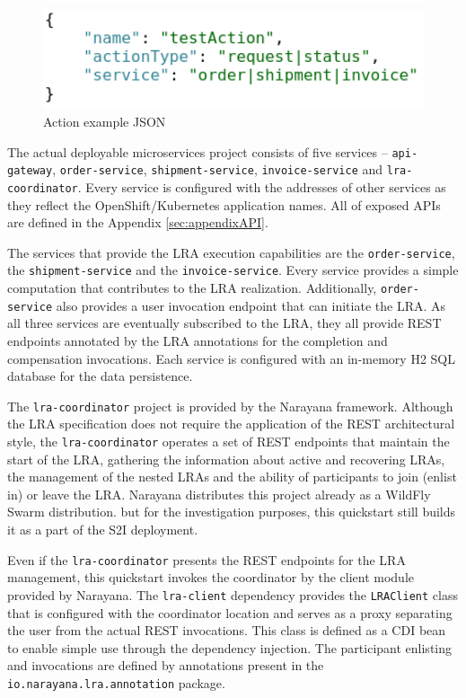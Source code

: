\documentclass[oneside,
  digital, %
  table,   %
  nolof,     %
  nolot,     %
]{fithesis3}
\begin{document}
\begin{figure}[h]
    \begin{center}
        \includegraphics[height=30mm]{images/actionJSON.png}
    \end{center}
    \caption{Action example JSON}
    \label{fig:action-json}
\end{figure}

The actual deployable microservices project consists of five services -- \texttt{api-gateway}, \texttt{order-service}, \texttt{shipment-service}, \texttt{invoice-service} and \texttt{lra-coordinator}. Every service is configured with the addresses of other services as they reflect the OpenShift/Kubernetes application names. All of exposed APIs are defined in the Appendix \ref{sec:appendixAPI}.

The services that provide the LRA execution capabilities are the \texttt{order-service}, the \texttt{shipment-service} and the \texttt{invoice-service}. Every service provides a simple computation that contributes to the LRA realization. Additionally, \texttt{order-service} also provides a user invocation endpoint that can initiate the LRA. As all three services are eventually subscribed to the LRA, they all provide REST endpoints annotated by the LRA annotations for the completion and compensation invocations. Each service is configured with an in-memory H2 SQL database for the data persistence.

The \texttt{lra-coordinator} project is provided by the Narayana framework. Although the LRA specification does not require the application of the REST architectural style, the \texttt{lra-coordinator} operates a set of REST endpoints that maintain the start of the LRA, gathering the information about active and recovering LRAs, the management of the nested LRAs and the ability of participants to join (enlist in) or leave the LRA. Narayana distributes this project already as a WildFly Swarm distribution. but for the investigation purposes, this quickstart still builds it as a part of the S2I deployment.

Even if the \texttt{lra-coordinator} presents the REST endpoints for the LRA management, this quickstart invokes the coordinator by the client module provided by Narayana. The \texttt{lra-client} dependency provides the \texttt{LRAClient} class that is configured with the coordinator location and serves as a proxy separating the user from the actual REST invocations. This class is defined as a CDI bean to enable simple use through the dependency injection. The participant enlisting and invocations are defined by annotations present in the \texttt{io.narayana.lra.annotation} package.
\end{document}
